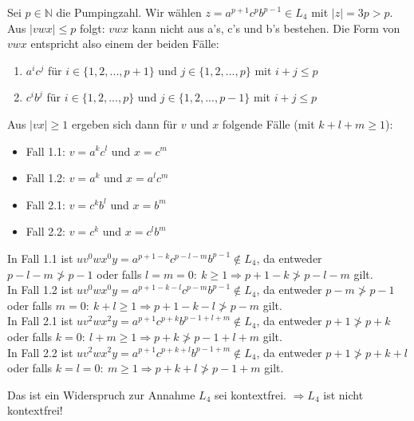 	Sei $p \in \mathbb{N}$ die Pumpingzahl. Wir wählen $z = a^{p+1}c^pb^{p-1} \in L_4$ mit $|z| = 3p > p$.\\
	Aus $|vwx| \leq p$ folgt: $vwx$ kann nicht aus a's, c's und b's bestehen. Die Form von $vwx$ entspricht also einem der beiden Fälle:
	\begin{enumerate}
		\item $a^ic^j$ für $i \in \{1,2,...,p+1\}$ und $j \in \{1,2,...,p\}$ mit $i+j \leq p$
		\item $c^ib^j$ für $i \in \{1,2,...,p\}$ und $j \in \{1,2,...,p-1\}$ mit $i+j \leq p$
	\end{enumerate}
	Aus $|vx| \geq 1$ ergeben sich dann für $v$ und $x$ folgende Fälle (mit $k+l+m  \geq 1$):
	\begin{itemize}
		\item Fall 1.1: $v=a^kc^l$ und $x=c^m$
		\item Fall 1.2: $v=a^k$ und $x=a^lc^m$
		\item Fall 2.1: $v=c^kb^l$ und $x=b^m$
		\item Fall 2.2: $v=c^k$ und $x=c^lb^m$
	\end{itemize}
	In Fall 1.1 ist $uv^0wx^0y=a^{p+1-k}c^{p-l-m}b^{p-1} \notin L_4$, da entweder $p-l-m \ngtr p-1$ oder falls $l=m=0:\ k\geq 1 \Rightarrow p+1-k \ngtr p-l-m$ gilt.\\
	In Fall 1.2 ist $uv^0wx^0y=a^{p+1-k-l}c^{p-m}b^{p-1} \notin L_4$, da entweder $p-m \ngtr p-1$ oder falls $m=0:\ k+l\geq 1 \Rightarrow p+1-k-l \ngtr p-m$ gilt.\\
	In Fall 2.1 ist $uv^2wx^2y=a^{p+1}c^{p+k}b^{p-1+l+m} \notin L_4$, da entweder $p+1 \ngtr p+k$ oder falls $k=0:\ l+m\geq 1 \Rightarrow p+k \ngtr p-1+l+m$ gilt.\\
	In Fall 2.2 ist $uv^2wx^2y=a^{p+1}c^{p+k+l}b^{p-1+m} \notin L_4$, da entweder $p+1 \ngtr p+k+l$ oder falls $k=l=0:\ m\geq 1 \Rightarrow p+k+l \ngtr p-1+m$ gilt.
	
	Das ist ein Widerspruch zur Annahme $L_4$ sei kontextfrei. $\Rightarrow L_4$ ist nicht kontextfrei!
	



\newpage